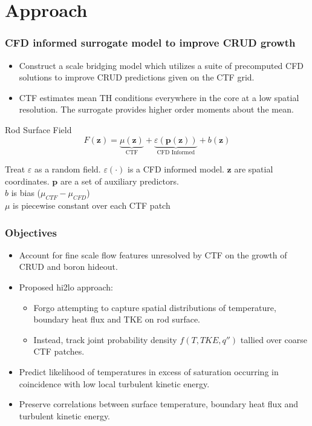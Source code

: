 \documentclass[t, pdftex]{beamer}
\begin{document}
\section{Approach}
\begin{frame}
    \frametitle{CFD informed surrogate model to improve CRUD growth}
    \begin{itemize}
    \item Construct a scale bridging model which utilizes a suite of precomputed CFD solutions to improve CRUD predictions given on the CTF grid. 
    \item CTF estimates mean TH conditions everywhere in the core at a low spatial resolution.  The surrogate provides higher order moments about the mean.
    \end{itemize}
    \begin{block}{Rod Surface Field}
        \[ 
        F(\mathbf z) = \underbrace{\mu(\mathbf{z})}_\text{CTF} + \underbrace{\varepsilon({\mathbf p(\mathbf z)})}_\text{CFD Informed} + b(\mathbf{z})
        \]
    \end{block}
    Treat $\varepsilon$ as a random field.  $\varepsilon(\cdot)$ is a CFD informed model. $\mathbf z$ are spatial coordinates. $\mathbf p$ are a set of auxiliary predictors. \\
    $b$ is bias ($\mu_{CTF} - \mu_{CFD}$) \\
    $\mu$ is piecewise constant over each CTF patch
\end{frame}

\begin{frame}\frametitle{Objectives}
\begin{itemize}
\item Account for fine scale flow features unresolved by CTF on the growth of CRUD and boron hideout.
\item Proposed hi2lo approach:
\begin{itemize}
	\item Forgo attempting to capture spatial distributions of temperature, boundary heat flux and TKE on rod surface. 
	\item Instead, track joint probability density $f(T, TKE, q'')$ tallied over coarse CTF patches.
\end{itemize}
	\item Predict likelihood of temperatures in excess of saturation occurring in coincidence with low local turbulent kinetic energy.
	\item Preserve correlations between surface temperature, boundary heat flux and turbulent kinetic energy.
\end{itemize}
\end{frame}
\end{document}
